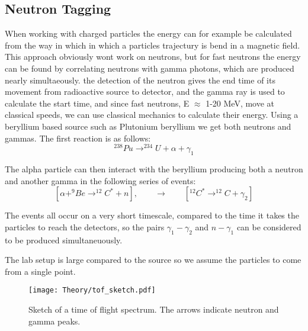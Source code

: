 \documentclass[main.tex]{subfiles}
\begin{document}
\subsection{Neutron Tagging}
When working with charged particles the energy can for example be calculated from the way in which in which a particles trajectury is bend in a magnetic field. This approach obviously wont work on neutrons, but for fast neutrons the energy can be found by correlating neutrons with gamma photons, which are produced nearly simultaeously. the detection of the neutron gives the end time of its movement from radioactive source to detector, and the gamma ray is used to calculate the start time, and since fast neutrons, E $\approx$ 1-20 MeV, move at classical speeds, we can use classical mechanics to calculate their energy. 
Using a beryllium based source such as Plutonium beryllium we get both neutrons and gammas. The first reaction is as follows: $$^{238}Pu\rightarrow^{234}U+\alpha+\gamma_1$$

The alpha particle can then interact with the beryllium producing both a neutron and another gamma in the following series of events: $$[\alpha+^{9}Be\rightarrow^{12}C^{*}+n],\qquad \longrightarrow \qquad [^{12}C^ {*}\rightarrow^{12}C+\gamma_2]$$

The events all occur on a very short timescale, compared to the time it takes the particles to reach the detectors, so the pairs $\gamma_1-\gamma_2$ and $n-\gamma_1$ can be considered to be produced simultaneuously. %

The lab setup is large compared to the source so we assume the particles to come from a single point.
\begin{figure}[ht]
    \centering
        \texttt{[image: Theory/tof\_sketch.pdf]}
        \caption{Sketch of a time of flight spectrum. The arrows indicate neutron and gamma peaks.}
    \label{fig:tof_sketch} 
\end{figure}
\end{document}
